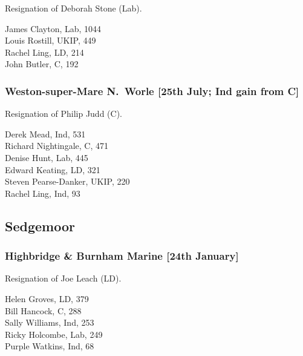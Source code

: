 \documentclass[a4paper,openany,10pt]{book}
\begin{document}

Resignation of Deborah Stone (Lab).



James Clayton, Lab, 1044\\
Louis Rostill, UKIP, 449\\
Rachel Ling, LD, 214\\
John Butler, C, 192\\


\subsubsection*{Weston-super-Mare N.\ Worle \hspace*{\fill}\nolinebreak[1]%
\enspace\hspace*{\fill}
[25th July; Ind gain from C]}


Resignation of Philip Judd (C).



Derek Mead, Ind, 531\\
Richard Nightingale, C, 471\\
Denise Hunt, Lab, 445\\
Edward Keating, LD, 321\\
Steven Pearse-Danker, UKIP, 220\\
Rachel Ling, Ind, 93\\


\subsection*{Sedgemoor}

\subsubsection*{Highbridge \& Burnham Marine \hspace*{\fill}\nolinebreak[1]%
\enspace\hspace*{\fill}
[24th January]}


Resignation of Joe Leach (LD).



Helen Groves, LD, 379\\
Bill Hancock, C, 288\\
Sally Williams, Ind, 253\\
Ricky Holcombe, Lab, 249\\
Purple Watkins, Ind, 68\\
\end{document}
